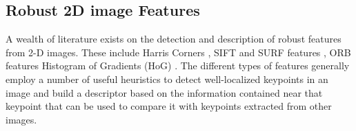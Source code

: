%
%
%


\subsection{Robust 2D image Features}
\label{sec.2Dfeatures}

A wealth of literature exists on the detection and description of robust features from 2-D images. These include Harris Corners \cite{Harris1988}, SIFT and SURF features \cite{Lowe2004} \cite{Bay2006}, ORB features \cite{Rublee2011} Histogram of Gradients (HoG) \cite{Dalal2005}. The different types of features generally employ a number of useful heuristics to detect well-localized keypoints in an image and build a descriptor based on the information contained near that keypoint that can be used to compare it with keypoints extracted from other images. 

